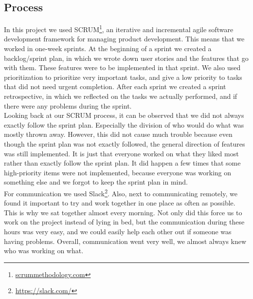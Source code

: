 \subsection{Process}
In this project we used SCRUM\footnote{\url{scrummethodology.com}}, an iterative and incremental agile software development framework for managing product development. This means that we worked in one-week sprints. At the beginning of a sprint we created a backlog/sprint plan, in which we wrote down user stories and the features that go with them. These features were to be implemented in that sprint. We also used prioritization to prioritize very important tasks, and give a low priority to tasks that did not need urgent completion. After each sprint we created a sprint retrospective, in which we reflected on the tasks we actually performed, and if there were any problems during the sprint.\\
Looking back at our SCRUM process, it can be observed that we did not always exactly follow the sprint plan. Especially the division of who would do what was mostly thrown away. However, this did not cause much trouble because even though the sprint plan was not exactly followed, the general direction of features was still implemented. It is just that everyone worked on what they liked most rather than exactly follow the sprint plan. It did happen a few times that some high-priority items were not implemented, because everyone was working on something else and we forgot to keep the sprint plan in mind.\\
For communication we used Slack\footnote{\url{https://slack.com/}}. Also, next to communicating remotely, we found it important to try and work together in one place as often as possible. This is why we sat together almost every morning. Not only did this force us to work on the project instead of lying in bed, but the communication during these hours was very easy, and we could easily help each other out if someone was having problems. Overall, communication went very well, we almost always knew who was working on what.
